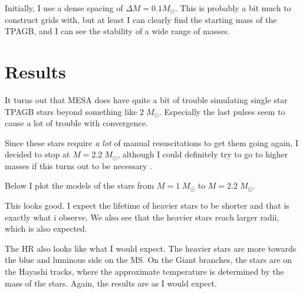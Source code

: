 \documentclass[a4paper,10pt]{article}
\begin{document}
Initially, I use a dense spacing of \(\Delta M = 0.1M_\odot \). This is probably a bit much to construct grids with, but at least I can clearly find the starting mass of the TPAGB, and I can see the stability of a wide range of masses.

\section{Results}
It turns out that MESA does have quite a bit of trouble simulating single star TPAGB stars beyond something like \(2\;M_\odot \). Especially the last pulses seem to cause a lot of trouble with convergence.

Since these stars require \emph{a lot} of manual resuscitations to get them going again, I decided to stop at \(M=2.2\;M_\odot \), although I could definitely try to go to higher masses if this turns out to be necessary
.

Below I plot the models of the stars from \(M = 1\;M_\odot \) to \(M = 2.2\;M_\odot \).

\begin{figure}[ht]
    \centering
\end{figure}
This looks good. I expect the lifetime of heavier stars to be shorter and that is exactly what i observe. We also see that the heavier stars reach larger radii, which is also expected.

\begin{figure}[ht]
    \centering
\end{figure}

The HR also looks like what I would expect.
The heavier stars are more towards the blue and luminous side on the MS. On the Giant branches, the stars are on the Hayashi tracks, where the approximate temperature is determined by the mass of the stars. Again, the results are as I would expect.

\begin{figure}[ht]
    \centering
\end{figure}

\begin{figure}[ht]
    \centering
\end{figure}
\end{document}
